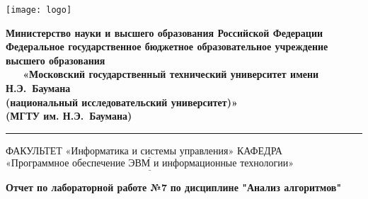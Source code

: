   \thispagestyle{empty}
  \begin{titlepage}
      \noindent \begin{minipage}{0.15\textwidth}
      \texttt{[image: logo]}
      \end{minipage}
      \noindent\begin{minipage}{0.9\textwidth}\centering
          \textbf{Министерство науки и высшего образования Российской Федерации}\\
          \textbf{Федеральное государственное бюджетное образовательное учреждение высшего образования}\\
          \textbf{~~~«Московский государственный технический университет имени Н.Э.~Баумана}\\
          \textbf{(национальный исследовательский университет)»}\\
          \textbf{(МГТУ им. Н.Э.~Баумана)}
      \end{minipage}
      
      \noindent\rule{18cm}{3pt}
      \newline\newline
      \noindent ФАКУЛЬТЕТ $\underline{\text{«Информатика и системы управления»}}$ \newline\newline
      \noindent КАФЕДРА $\underline{\text{«Программное обеспечение ЭВМ и информационные технологии»}}$\newline\newline\newline\newline\newline\newline\newline\newline\newline\newline\newline
      
      
      \begin{center}
          \noindent\begin{minipage}{1.3\textwidth}\centering
              \Large\textbf{  Отчет по лабораторной работе №7}\newline
              \textbf{по дисциплине "Анализ алгоритмов"}\newline\newline
          \end{minipage}
      \end{center}
      

\end{titlepage}
